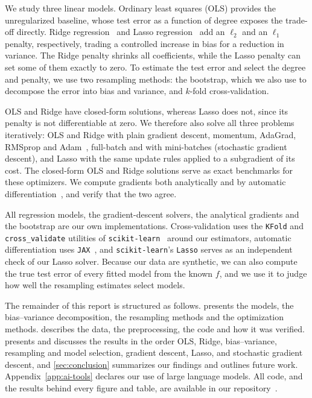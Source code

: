 We study three linear models. Ordinary least squares (OLS) provides the
unregularized baseline,
whose test error as a function of degree exposes the trade-off directly.
Ridge regression~\cite{hoerl_1970} and Lasso regression~\cite{tibshirani_1996}
add an $\ell_2$ and an $\ell_1$ penalty, respectively, trading a controlled increase in bias for
a reduction in variance. The Ridge penalty shrinks all coefficients, while the Lasso penalty can
set some of them exactly to zero. To estimate the test error and select the degree and penalty,
we use two resampling methods: the bootstrap, which we also use to decompose the error into bias
and variance, and $k$-fold cross-validation.

OLS and Ridge have closed-form solutions, whereas Lasso does not, since its
penalty is not differentiable at zero. We therefore also solve all three problems
iteratively: OLS and Ridge with plain gradient descent, momentum, AdaGrad,
RMSprop and Adam~\cite{kingma_2017}, full-batch and with
mini-batches (stochastic gradient descent), and Lasso with the same update rules
applied to a subgradient of its cost. The closed-form
OLS and Ridge solutions serve as exact benchmarks for these optimizers. We
compute gradients both analytically and by automatic
differentiation~\cite{baydin_2018}, and verify that the two agree.

All regression models, the gradient-descent solvers, the analytical
gradients and the bootstrap are our own implementations. Cross-validation uses
the \texttt{KFold} and \texttt{cross\_validate} utilities of
\texttt{scikit-learn}~\cite{pedregosa_2011} around our
estimators, automatic differentiation uses
\texttt{JAX}~\cite{bradbury_2018}, and
\texttt{scikit-learn}'s \texttt{Lasso} serves as an independent check of our
Lasso solver. Because our data are synthetic, we can also compute the true test
error of every fitted model from the known $f$, and we use it to judge how well
the resampling estimates select models.

The remainder of this report is structured as follows. 
presents the models, the bias--variance decomposition, the resampling methods
and the optimization methods.  describes the data,
the preprocessing, the code and how it was verified.
 presents and discusses the results in the order
OLS, Ridge, bias--variance, resampling and model selection, gradient descent,
Lasso, and stochastic gradient descent, and \cref{sec:conclusion} summarizes our
findings and outlines future work. Appendix~\ref{app:ai-tools} declares our use of
large language models. All code, and the results behind every figure and table,
are available in our repository~\cite{riseth_2026}.
